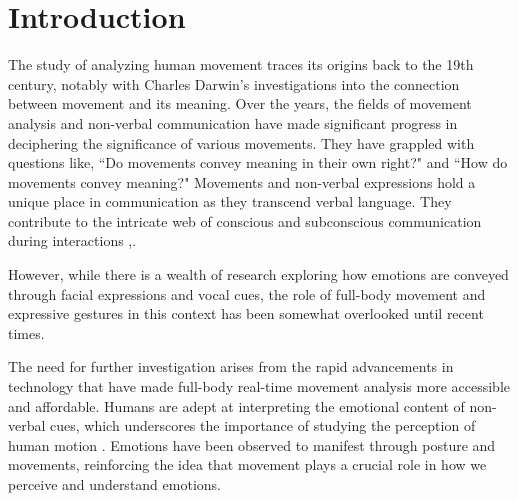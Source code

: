 \chapter{Introduction}
The study of analyzing human movement traces its origins back to the 19th century, notably with Charles Darwin's investigations into the connection between movement and its meaning. 
Over the years, the fields of movement analysis and non-verbal communication have made significant progress in deciphering the significance of various movements. 
They have grappled with questions like, “Do movements convey meaning in their own right?" and “How do movements convey meaning?"
Movements and non-verbal expressions hold a unique place in communication as they transcend verbal language. 
They contribute to the intricate web of conscious and subconscious communication during interactions \cite{Daly:1988},\cite{laffaye:2013}. 

However, while there is a wealth of research exploring how emotions are conveyed through facial expressions and vocal cues, the role of full-body movement and expressive gestures in this context has been somewhat overlooked until recent times.

The need for further investigation arises from the rapid advancements in technology that have made full-body real-time movement analysis more accessible and affordable. 
Humans are adept at interpreting the emotional content of non-verbal cues, which underscores the importance of studying the perception of human motion \cite{samadani:2011}. 
Emotions have been observed to manifest through posture and movements, reinforcing the idea that movement plays a crucial role in how we perceive and understand emotions.

